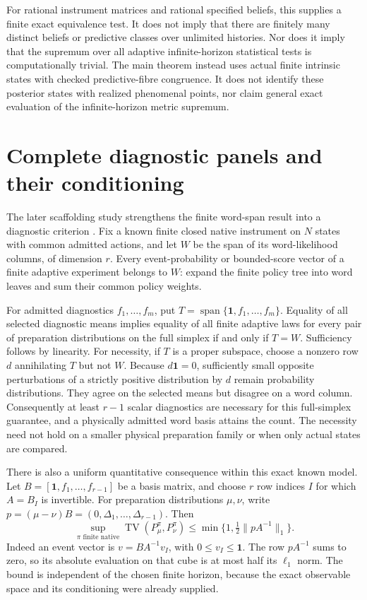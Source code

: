 For rational instrument matrices and rational specified beliefs, this supplies a finite exact equivalence test. It does not imply that there are finitely many distinct beliefs or predictive classes over unlimited histories. Nor does it imply that the supremum over all adaptive infinite-horizon statistical tests is computationally trivial. The main theorem instead uses actual finite intrinsic states with checked predictive-fibre congruence. It does not identify these posterior states with realized phenomenal points, nor claim general exact evaluation of the infinite-horizon metric supremum.

\section{Complete diagnostic panels and their conditioning}
\label{sec:update-diagnostics}
The later scaffolding study strengthens the finite word-span result into a diagnostic criterion \cite{RodgersDevelopment2026}. Fix a known finite closed native instrument on $N$ states with common admitted actions, and let $W$ be the span of its word-likelihood columns, of dimension $r$. Every event-probability or bounded-score vector of a finite adaptive experiment belongs to $W$: expand the finite policy tree into word leaves and sum their common policy weights.

For admitted diagnostics $f_1,\ldots,f_m$, put $T=\operatorname{span}\{\mathbf1,f_1,\ldots,f_m\}$. Equality of all selected diagnostic means implies equality of all finite adaptive laws for every pair of preparation distributions on the full simplex if and only if $T=W$. Sufficiency follows by linearity. For necessity, if $T$ is a proper subspace, choose a nonzero row $d$ annihilating $T$ but not $W$. Because $d\mathbf1=0$, sufficiently small opposite perturbations of a strictly positive distribution by $d$ remain probability distributions. They agree on the selected means but disagree on a word column. Consequently at least $r-1$ scalar diagnostics are necessary for this full-simplex guarantee, and a physically admitted word basis attains the count. The necessity need not hold on a smaller physical preparation family or when only actual states are compared.

There is also a uniform quantitative consequence within this exact known model. Let $B=[\mathbf1,f_1,\ldots,f_{r-1}]$ be a basis matrix, and choose $r$ row indices $I$ for which $A=B_I$ is invertible. For preparation distributions $\mu,\nu$, write $p=(\mu-\nu)B=(0,\Delta_1,\ldots,\Delta_{r-1})$. Then
\[
\sup_{\pi\text{ finite native}}
\operatorname{TV}(P_\mu^\pi,P_\nu^\pi)
\le\min\{1,\tfrac12\|pA^{-1}\|_1\}.
\]
Indeed an event vector is $v=B A^{-1}v_I$, with $0\le v_I\le\mathbf1$. The row $pA^{-1}$ sums to zero, so its absolute evaluation on that cube is at most half its $\ell_1$ norm. The bound is independent of the chosen finite horizon, because the exact observable space and its conditioning were already supplied.

